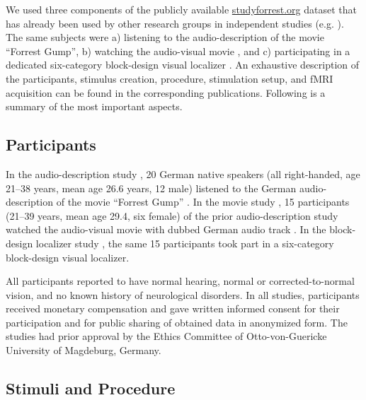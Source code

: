 \documentclass[english]{article}
\begin{document}

We used three components of the publicly available
\href{http://www.studyforrest.org}{studyforrest.org} dataset that has already
been used by other research groups in independent studies (e.g.
\citep{ben2018hippocampal, jiahui2019predicting, hu2017decoding,
lettieri2019emotionotopy, nguyen2016integration}).
The same subjects were
a) listening to the audio-description \citep{hanke2014audiomovie} of
the movie ``Forrest Gump'',
b) watching the audio-visual movie \citep{hanke2016simultaneous}, and
c) participating in a dedicated six-category block-design visual localizer \citep{sengupta2016extension}.
An exhaustive description of the participants, stimulus creation, procedure,
stimulation setup, and fMRI acquisition can be found in the corresponding
publications. Following is a summary of the most important aspects.


\subsection{Participants}
In the audio-description study \citep{hanke2014audiomovie}, 20 German native speakers (all
right-handed, age 21–38 years, mean age 26.6 years, 12 male) listened to the
German audio-description \citep{ForrestGumpGermanAD} of the movie ``Forrest
Gump'' \citep{ForrestGumpMovie}.
In the movie study \citep{hanke2016simultaneous}, 15 participants (21–39 years,
mean age 29.4, six female) of the prior audio-description study watched the audio-visual movie
with dubbed German audio track \citep{ForrestGumpDVD}.
In the block-design localizer study \citep{sengupta2016extension}, the same 15 participants took
part in a six-category block-design visual localizer.

All participants reported to have normal hearing, normal or corrected-to-normal
vision, and no known history of neurological disorders.
In all studies, participants received monetary compensation and gave written
informed consent for their participation and for public sharing of obtained data
in anonymized form. The studies had prior approval by the Ethics Committee of
Otto-von-Guericke University of Magdeburg, Germany.


\subsection{Stimuli and Procedure}
\end{document}
